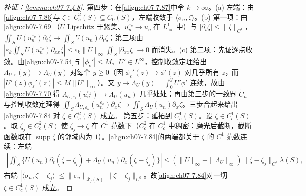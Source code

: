 ﻿\documentclass[../../main.tex]{subfiles}%
\begin{document}
\begin{proof}[补证：\cref{lemma:ch07-7.4.8}]
第四步：在\eqref{align:ch07-7.87}中令 $k\to\infty$。(a) 左端：由\eqref{align:ch07-7.86}与 $\zeta\in C^2_c(S)\subseteq C_0(S)$，左端收敛于 $\langle\sigma_n,\zeta\rangle$。(b) 第一项：由\eqref{align:ch07-7.69}（$U$ Lipschitz 于紧集、$u_n^{\varepsilon_k}\to u_n$ 在 $L^1_{\mathrm{loc}}$ 中）与 $|\partial_t\zeta|\leqslant\|\zeta\|_{C^1}$，$\iint_SU(u_n^{\varepsilon_k})\partial_t\zeta\to\iint_SU(u_n)\partial_t\zeta$；第三项由 $|\varepsilon_k\iint_SU(u_n^{\varepsilon_k})\partial_{xx}\zeta|\leqslant\varepsilon_k\|U\|_\infty\iint_S|\partial_{xx}\zeta|\to0$ 而消失。(c) 第二项：先证逐点收敛。由\eqref{align:ch07-7.54}与 $|\phi_\varepsilon'|\leqslant M$、$U'\in L^\infty$，控制收敛定理给出 $\Lambda_{U,\varepsilon}(y)\to\Lambda_U(y)$ 对每个 $y\geqslant0$（因 $\phi_\varepsilon'(z)\to\phi'(z)$ 对几乎所有 $z$，而 $|U'(z)\phi_\varepsilon'(z)|\leqslant M\|U'\|_\infty$）。又 $y\mapsto\Lambda_U(y)=\int_0^yU'\phi'$ 连续，故由\eqref{align:ch07-7.70}得 $\Lambda_{U,\varepsilon_k}(u_n^{\varepsilon_k})\to\Lambda_U(u_n)$ 几乎处处；再由第三步的一致界 $\widetilde C_n$ 与控制收敛定理得 $\iint_S\Lambda_{U,\varepsilon_k}(u_n^{\varepsilon_k})\partial_x\zeta\to\iint_S\Lambda_U(u_n)\partial_x\zeta$。三步合起来给出\eqref{align:ch07-7.84}对 $\zeta\in C^2_c(S)$ 成立。
第五步：延拓到 $C^1_c(S)$。设 $\zeta\in C^1_c(S)$。取 $\zeta_j\in C^2_c(S)$ 使 $\zeta_j\to\zeta$ 在 $C^1$ 范数下（$C^2_c$ 在 $C^1_c$ 中稠密：磨光后截断，截断函数取在 $\operatorname{supp}\zeta$ 的邻域内为 $1$）。\eqref{align:ch07-7.84}的两端都关于 $\zeta$ 的 $C^1$ 范数连续：左端
\begin{align*}
\left|\iint_S\{U(u_n)\partial_t(\zeta-\zeta_j)+\Lambda_U(u_n)\partial_x(\zeta-\zeta_j)\}\right|
\leqslant(\|U\|_\infty+\|\Lambda_U\|_\infty)\|\zeta-\zeta_j\|_{C^1}\lambda(S),
\end{align*}
右端 $|\langle\sigma_n,\zeta-\zeta_j\rangle|\leqslant\|\sigma_n\|_{\mathscr{R}_f(S)}\|\zeta-\zeta_j\|_{C^0}$。故\eqref{align:ch07-7.84}对一切 $\zeta\in C^1_c(S)$ 成立。
\end{proof}
\end{document}
